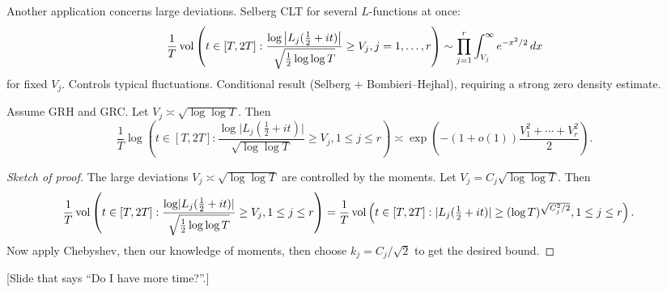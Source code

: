 \documentclass[reqno]{amsart} 
\begin{document}
Another application concerns large deviations.  Selberg CLT for several $L$-functions at once:
\begin{equation*}
  \frac{1}{T} \operatorname{vol} \left( t \in[T, 2 T] :
    \frac{\log \left| L_j(\tfrac{1}{2} + i t) \right|}{\sqrt{\tfrac{1}{2} \log \log T}} \geq V_j, j = 1, \dotsc, r\right)
  \sim \prod_{j = 1}^{r}
  \int_{V_j}^\infty e^{- x^2 / 2} \, d x
\end{equation*}
for fixed $V_j$.  Controls typical fluctuations.  Conditional result (Selberg + Bombieri--Hejhal), requiring a strong zero density estimate.
\begin{theorem}[H.\ 2024+]
  Assume GRH and GRC.  Let $V_j \asymp \sqrt{\log \log T}$.  Then
  \begin{equation*}
    \frac{1}{T}
    \log \left( t \in[T, 2 T] : \frac{\log \lvert L_j(\tfrac{1}{2} + i t) \rvert}{ \sqrt{\log \log T}} \geq V_j, 1 \leq j \leq r \right)
    \asymp \exp \left( -(1 + o (1))
      \frac{V_1^2 + \dotsb + V_r^2}{2}\right).
  \end{equation*}
\end{theorem}
\begin{proof}[Sketch of proof]
  The large deviations $V_j \asymp \sqrt{\log \log T}$ are controlled by the moments.  Let $V_j = C_j \sqrt{\log \log T}$.  Then
  \begin{align*}
    \frac{1}{T}
    \operatorname{vol} \left( t \in[T, 2 T] :
      \frac{\log \lvert L_j(\tfrac{1}{2} + i t) \rvert}{ \sqrt{\tfrac{1}{2} \log \log T}} \geq V_j, 1 \leq j \leq r\right)
    &=
    \frac{1}{T}
    \operatorname{vol} \left( t \in[T, 2 T] :
      \lvert L_j(\tfrac{1}{2} + i t) \rvert \geq(\log T)^{\sqrt{C_j^2 /2}}
      , 1 \leq j \leq r\right).
  \end{align*}
  Now apply Chebyshev, then our knowledge of moments, then choose $k_j = C_j / \sqrt{2}$ to get the desired bound.
\end{proof}

[Slide that says ``Do I have more time?''.]
\end{document}
